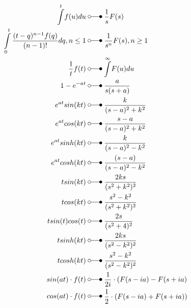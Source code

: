\begin{align*}
    \overset{t}{\operatorname*{\int}}f(u)du\;&\laplace\; \frac{1}{s}F(s)  \\
    \intop_{0}^{t}\frac{(t-q)^{n-1}f(q)}{(n-1)!}dq,n\leq1\;&\laplace\; \frac1{s^n}F(s),n\geq1  \\
    \frac{1}{t}f(t)\;&\laplace\; \overset{\infty}{\operatorname*{\int}}F(u)du  \\
    1-e^{-at}\;&\laplace\; \frac a{s(s+a)}  \\
    e^{at}sin(kt)\;&\laplace\; \frac k{(s-a)^2+k^2}  \\
    e^{at}cos(kt)\;&\laplace\; \frac{s-a}{(s-a)^2+k^2}  \\
    e^{at}sinh(kt)\;&\laplace\; \frac k{(s-a)^2-k^2}  \\
    e^{at}cosh(kt)\;&\laplace\; \frac{(s-a)}{(s-a)^2-k^2}  \\
    tsin(kt)\;&\laplace\; \frac{2ks}{(s^2+k^2)^2}  \\
    tcos(kt)\;&\laplace\; \frac{s^2-k^2}{(s^2+k^2)^2}  \\
    tsin(t)cos(t)\;&\laplace\; \frac{2s}{(s^2+4)^2}  \\
    tsinh(kt)\;&\laplace\; \frac{2ks}{(s^2-k^2)^2}  \\
    tcosh(kt)\;&\laplace\; \frac{s^2-k^2}{(s^2-k^2)^2}  \\
    sin(at)\cdot f(t)\;&\laplace\; \frac{1}{2i}\cdot(F(s-ia)-F(s+ia)  \\
    cos(at)\cdot f(t)\;&\laplace\; \begin{aligned}\frac{1}{2}\cdot(F(s-ia)+F(s+ia))\end{aligned} 
\end{align*}
